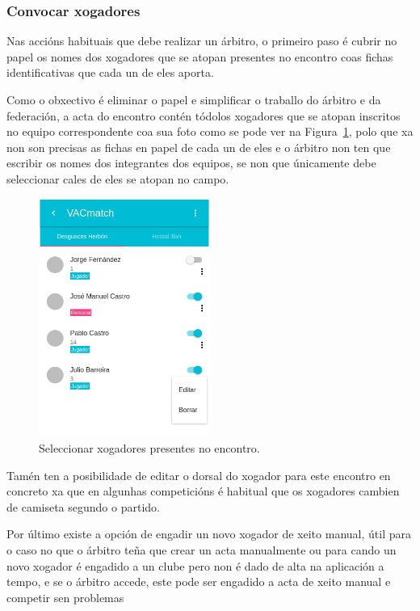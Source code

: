       \subsubsection{Convocar xogadores}
      Nas accións habituais que debe realizar un árbitro, o 
primeiro paso é cubrir no papel os nomes dos xogadores que se atopan presentes 
no encontro coas fichas identificativas que cada un de eles aporta.

      Como o obxectivo é eliminar o papel e simplificar o traballo do árbitro 
e da federación, a acta do encontro contén tódolos xogadores que 
se atopan inscritos no equipo correspondente coa sua foto como se pode ver na 
Figura~\ref{fig:design:callplayers}, polo que xa non son 
precisas as fichas en papel de cada un de eles e o árbitro non ten que escribir 
os nomes dos integrantes dos equipos, se non que únicamente debe seleccionar 
cales de eles se atopan no campo.

    \begin{figure}[h!]
      \begin{center}
      \includegraphics[width=0.5\textwidth]{./img/demo/9_calllist.png}
      \caption{Seleccionar xogadores presentes no encontro.}
      \label{fig:design:callplayers}
      \end{center}
    \end{figure}

      Tamén ten a posibilidade de editar o dorsal do xogador para este encontro 
en concreto xa que en algunhas competicións é habitual que os xogadores cambien 
de camiseta segundo o partido.

      Por último existe a opción de engadir un novo xogador de xeito 
manual, útil para o caso no que o árbitro teña que crear un acta manualmente ou 
para cando un novo xogador é engadido a un clube pero non é dado de alta na 
aplicación a tempo, e se o árbitro accede, este pode ser engadido a acta de 
xeito manual e competir sen problemas

